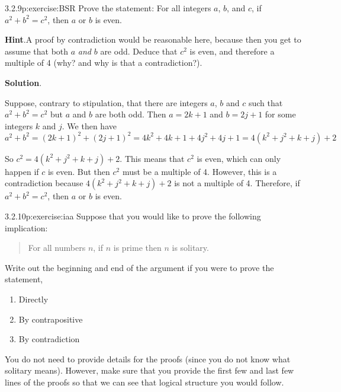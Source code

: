 \documentclass[twoside,11pt,]{book}
\newcommand{\blocktitlefont}{\relax}
\numberwithin{equation}{chapter}
\begin{document}
\begin{divisionsolution}{3.2.9}{}{p:exercise:BSR}%
Prove the statement: For all integers \(a\), \(b\), and \(c\), if \(a^2 + b^2 = c^2\), then \(a\) or \(b\) is even.%
\par\smallskip%
\noindent\textbf{\blocktitlefont Hint}.\quad{}A proof by contradiction would be reasonable here, because then you get to assume that both \(a\) \emph{and} \(b\) are odd.  Deduce that \(c^2\) is even, and therefore a multiple of 4 (why? and why is that a contradiction?).%
\par\smallskip%
\noindent\textbf{\blocktitlefont Solution}.\quad{}\begin{solutionproof}
Suppose, contrary to stipulation, that there are integers \(a\), \(b\) and \(c\) such that \(a^2 + b^2 = c^2\) but \(a\) and \(b\) are both odd. Then \(a = 2k+1\) and \(b = 2j + 1\) for some integers \(k\) and \(j\). We then have%
\begin{equation*}
a^2 + b^2 = (2k+1)^2 + (2j+1)^2 = 4k^2 + 4k + 1 + 4j^2 + 4j + 1 = 4(k^2 + j^2 + k + j) + 2
\end{equation*}
%
\par
So \(c^2 = 4(k^2 + j^2 + k + j) + 2\). This means that \(c^2\) is even, which can only happen if \(c\) is even. But then \(c^2\) must be a multiple of 4. However, this is a contradiction because \(4(k^2 + j^2 + k + j) + 2\) is not a multiple of 4. Therefore, if \(a^2 + b^2 = c^2\), then \(a\) or \(b\) is even.%
\end{solutionproof}
\end{divisionsolution}%
\begin{divisionsolution}{3.2.10}{}{p:exercise:iaa}%
Suppose that you would like to prove the following implication:%
\begin{quote}%
For all numbers \(n\), if \(n\) is prime then \(n\) is solitary.%
\end{quote}
Write out the beginning and end of the argument if you were to prove the statement,%
\begin{enumerate}[label=(\alph*)]
\item{}Directly%
\item{}By contrapositive%
\item{}By contradiction%
\end{enumerate}
%
\par
You do not need to provide details for the proofs (since you do not know what solitary means). However, make sure that you provide the first few and last few lines of the proofs so that we can see that logical structure you would follow.%
\end{divisionsolution}%
\end{document}
